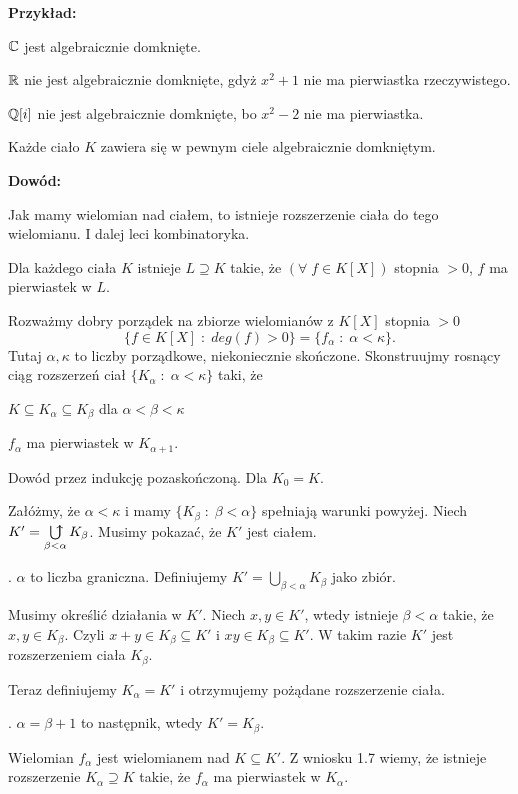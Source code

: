 \textbf{Przykład:}

\indent \point $\mathbb{C}$ jest algebraicznie domknięte.

\indent \point $\mathbb{R}$ nie jest algebraicznie domknięte, gdyż $x^2+1$ nie ma pierwiastka rzeczywistego.

\indent \point $\mathbb{Q}[i]$ nie jest algebraicznie domknięte, bo $x^2-2$ nie ma pierwiastka.

\begin{tw}
    Każde ciało $K$ zawiera się w pewnym ciele algebraicznie domkniętym.
\end{tw}

\textbf{Dowód:}

Jak mamy wielomian nad ciałem, to istnieje rozszerzenie ciała do tego wielomianu. I dalej leci kombinatoryka.

 Dla każdego ciała $K$ istnieje $L\supseteq K$ takie, że $(\forall\;f\in K[X])$ stopnia $>0$, $f$ ma pierwiastek w $L$.

Rozważmy dobry porządek na zbiorze wielomianów z $K[X]$ stopnia $>0$
$$\{f\in K[X]\;:\;deg(f)>0\}=\{f_\alpha\;:\;\alpha< \kappa\}.$$
Tutaj $\alpha,\kappa$ to liczby porządkowe, niekoniecznie skończone. Skonstruujmy rosnący ciąg rozszerzeń  ciał $\{K_\alpha\;:\;\alpha< \kappa\}$ taki, że 

\indent \point $K\subseteq K_\alpha\subseteq K_\beta$ dla $\alpha<\beta< \kappa$

\indent \point $f_\alpha$ ma pierwiastek w $K_{\alpha+1}$.

Dowód przez indukcję pozaskończoną. Dla $K_0=K$. 

Załóżmy, że $\alpha<\kappa$ i mamy $\{K_\beta\;:\;\beta<\alpha\}$ spełniają warunki powyżej.  Niech $K'=\ubigcup\limits_{\beta<\alpha}K_\beta$. Musimy pokazać, że $K'$ jest ciałem.

. $\alpha$ to liczba graniczna. Definiujemy $K'=\bigcup\limits_{\beta<\alpha}K_\beta$ jako zbiór. 

Musimy określić działania w $K'$. Niech $x,y\in K'$, wtedy istnieje $\beta<\alpha$ takie, że $x,y\in K_\beta$. Czyli $x+y\in K_\beta\subseteq K'$ i $xy\in K_\beta\subseteq K'$. W takim razie $K'$ jest rozszerzeniem ciała $K_\beta$.

Teraz definiujemy $K_\alpha=K'$ i otrzymujemy pożądane rozszerzenie ciała.

. $\alpha=\beta+1$ to następnik, wtedy $K'=K_\beta$. 

Wielomian $f_\alpha$ jest wielomianem nad $K\subseteq K'$. Z wniosku 1.7 wiemy, że istnieje rozszerzenie $K_\alpha\supseteq K$ takie, że $f_\alpha$ ma pierwiastek w $K_\alpha$.

